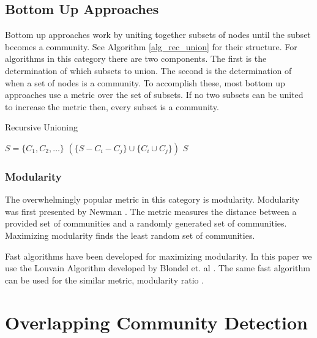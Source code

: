\documentclass[phd,tocprelim]{cornell}
\renewcommand{\caption}[1]{\singlespacing\hangcaption{#1}\normalspacing}
\begin{document}
\subsection{Bottom Up Approaches}
\label{sec:bottom_up}

Bottom up approaches work by uniting together subsets of nodes until the subset becomes a community.  See Algorithm \ref{alg_rec_union} for their structure.  For algorithms in this category there are two components.  The first is the determination of which subsets to union.  The second is the determination of when a set of nodes is a community.  To accomplish these, most bottom up approaches use a metric over the set of subsets.  If no two subsets can be united to increase the metric then, every subset is a community.

\begin{algorithm}                              %
\caption{{\sc Recursive Unioning}}         %
\label{alg_bottom_up}                                   %
\begin{algorithmic}                        %
\REQUIRE $S = \{C_1, C_2, \dots \}$
$(\{S - C_i - C_j\} \cup \{C_i \cup C_j\})$
\ELSE
\RETURN $S$
\ENDIF
\end{algorithmic}
\label{alg_rec_union}
\end{algorithm}

\subsubsection{Modularity}

The overwhelmingly popular metric in this category is modularity.  Modularity was first presented by Newman \cite{newman}.  The metric measures the distance between a provided set of communities and a randomly generated set of communities.  Maximizing modularity finds the least random set of communities.

Fast algorithms have been developed for maximizing modularity.  In this paper we use the Louvain Algorithm developed by Blondel et. al \cite{blondel}.  The same fast algorithm can be used for the similar metric, modularity ratio \cite{JTODO}.

\section{Overlapping Community Detection}
\end{document}
